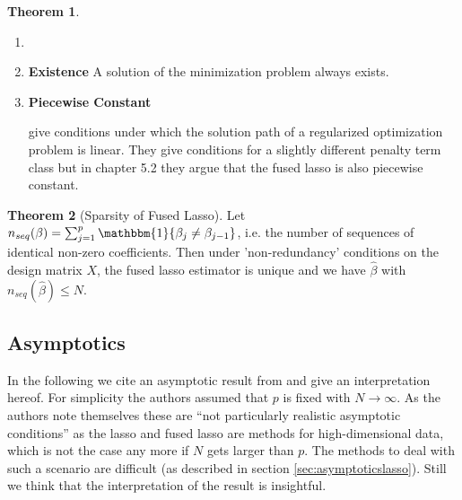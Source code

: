 \documentclass{article}
\theoremstyle{definition}
\newtheorem{theorem}{Theorem}
\begin{document}
\begin{theorem}
	\begin{enumerate}
		\item[]
		\item \textbf{Existence} A solution of the minimization problem always exists.
		\item \textbf{Piecewise Constant}
		
\citet{rosset2007piecewise} give conditions under which the solution path of a regularized optimization problem is linear. They give conditions for a slightly different penalty term class but in chapter 5.2 they argue that the fused lasso is also piecewise constant.
	\end{enumerate}
\end{theorem}


\begin{theorem}[Sparsity of Fused Lasso] \citep{fused}
	Let $n_{seq}(\beta) = \sum_{j=1}^{p} \mathbbm{1} \{\beta_j \neq \beta_{j-1}\}$, i.e. the number of sequences of identical non-zero coefficients. Then under 'non-redundancy' conditions on the design matrix $X$, the fused lasso estimator is unique and we have $\hat{\beta}$ with $n_{seq}(\hat{\beta}) \leq N$.
\end{theorem}


\subsection{Asymptotics}

In the following we cite an asymptotic result from \citet{fused} and give an interpretation hereof.
For simplicity the authors assumed that $p$ is fixed with $N \rightarrow \infty$. As the authors note themselves these are ``not particularly realistic asymptotic conditions'' as the lasso and fused lasso are methods for high-dimensional data, which is not the case any more if $N$ gets larger than $p$. The methods to deal with such a scenario are difficult (as described in section \ref{sec:asymptoticslasso}). Still we think that the interpretation of the result is insightful.
\end{document}
